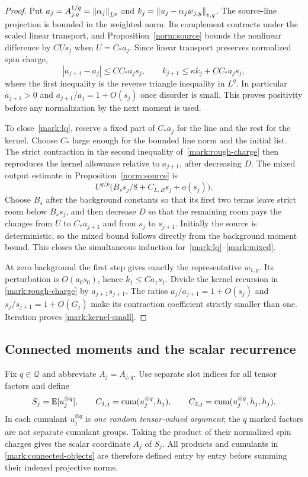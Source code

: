 \begin{proof}
Put $a_j=A_{j,q}^{1/q}=\left\lVert\alpha_j\right\rVert_{L^q}$ and
$k_j=\left\lVert u_j-\alpha_jw_{j,y}\right\rVert_{v,q}$.
The source-line projection is bounded in the weighted norm.  Its
complement contracts under the scaled linear transport, and
Proposition~\ref{norm:source} bounds the nonlinear difference by
$CUs_j$ when $U=C_*a_j$.  Since linear transport preserves normalized
spin charge,
\begin{equation}\label{mark:rough-charge}
 |a_{j+1}-a_j|\le C C_*a_js_j,
 \qquad
 k_{j+1}\le\kappa k_j+C C_*a_js_j,
\end{equation}
where the first inequality is the reverse triangle inequality in
$L^q$.  In particular $a_{j+1}>0$ and
$a_{j+1}/a_j=1+O(s_j)$ once disorder is small.  This proves positivity
before any normalization by the next moment is used.

To close~\eqref{mark:lq}, reserve a fixed part of $C_*a_j$ for the line
and the rest for the kernel.  Choose $C_*$ large enough for the bounded
line norm and the initial list.  The strict contraction in the second
inequality of~\eqref{mark:rough-charge} then reproduces the kernel
allowance relative to $a_{j+1}$, after decreasing $D$.
The mixed output estimate in Proposition~\ref{norm:source} is
\[
 U^{q/p}\bigl(B_s s_j/8+C_{L,B}s_j+o(s_j)\bigr).
\]
Choose $B_s$ after the background constants so that its first two terms
leave strict room below $B_s s_j$, and then decrease $D$ so that the
remaining room pays the changes from $U$ to $C_*a_{j+1}$ and from $s_j$
to $s_{j+1}$.  Initially the source is deterministic, so the mixed
bound follows directly from the background moment bound.  This closes
the simultaneous induction for~\eqref{mark:lq}--\eqref{mark:mixed}.

At zero background the first step gives exactly the representative
$w_{1,y}$.  Its perturbation is $O(a_0s_0)$, hence
$k_1\le Ca_1s_1$.  Divide the kernel recursion in
\eqref{mark:rough-charge} by $a_{j+1}s_{j+1}$.  The ratios
$a_j/a_{j+1}=1+O(s_j)$ and $s_j/s_{j+1}=1+O(G_j)$ make its contraction
coefficient strictly smaller than one.  Iteration proves
\eqref{mark:kernel-small}.
\end{proof}

\subsection{Connected moments and the scalar recurrence}
Fix $q\in\mathcal Q$ and abbreviate $A_j=A_{j,q}$.  Use separate slot indices
for all tensor factors and define
\begin{equation}\label{mark:connected-objects}
 S_j=\mathbb E[u_j^{\otimes q}],\qquad
 C_{1,j}=\operatorname{cum}(u_j^{\otimes q},h_j),\qquad
 C_{2,j}=\operatorname{cum}(u_j^{\otimes q},h_j,h_j).
\end{equation}
In each cumulant $u_j^{\otimes q}$ is \emph{one random tensor-valued
argument}; the $q$ marked factors are not separate cumulant groups.
Taking the product of their normalized spin charges gives the scalar
coordinate $A_j$ of $S_j$.  All products and cumulants in
\eqref{mark:connected-objects} are therefore defined entry by entry
before summing their indexed projective norms.

